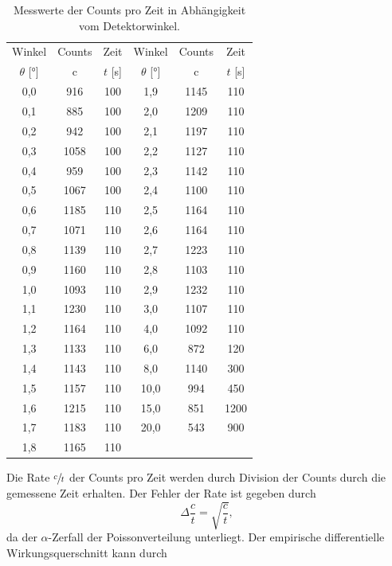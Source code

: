 \begin{table}[H]
  \centering
  \begin{tabular}{ccc|ccc}
    \toprule
    Winkel & Counts & Zeit & Winkel & Counts & Zeit \\
    $\theta$ [°] & c & $t$ [s] & $\theta$ [°] & c & $t$ [s] \\
    \midrule
    0,0 &  916 & 100 &  1,9 & 1145 & 110  \\
    0,1 &  885 & 100 &  2,0 & 1209 & 110  \\
    0,2 &  942 & 100 &  2,1 & 1197 & 110  \\
    0,3 & 1058 & 100 &  2,2 & 1127 & 110  \\
    0,4 &  959 & 100 &  2,3 & 1142 & 110  \\
    0,5 & 1067 & 100 &  2,4 & 1100 & 110  \\
    0,6 & 1185 & 110 &  2,5 & 1164 & 110  \\
    0,7 & 1071 & 110 &  2,6 & 1164 & 110  \\
    0,8 & 1139 & 110 &  2,7 & 1223 & 110  \\
    0,9 & 1160 & 110 &  2,8 & 1103 & 110  \\
    1,0 & 1093 & 110 &  2,9 & 1232 & 110  \\
    1,1 & 1230 & 110 &  3,0 & 1107 & 110  \\
    1,2 & 1164 & 110 &  4,0 & 1092 & 110  \\
    1,3 & 1133 & 110 &  6,0 &  872 & 120  \\
    1,4 & 1143 & 110 &  8,0 & 1140 & 300  \\
    1,5 & 1157 & 110 & 10,0 &  994 & 450  \\
    1,6 & 1215 & 110 & 15,0 &  851 & 1200 \\
    1,7 & 1183 & 110 & 20,0 &  543 & 900  \\
    1,8 & 1165 & 110 &                    \\
    \bottomrule
  \end{tabular}
  \caption{Messwerte der Counts pro Zeit in Abhängigkeit vom Detektorwinkel.}
  \label{tab:WQ}
\end{table}
Die Rate $\sfrac{c}{t}$ der Counts pro Zeit werden durch Division der Counts durch die gemessene Zeit erhalten.
Der Fehler der Rate ist gegeben durch
\begin{equation}
  \Delta{\frac{c}{t}} = \sqrt{\frac{c}{t}},
\end{equation}
da der $\alpha$-Zerfall der Poissonverteilung unterliegt.
Der empirische differentielle Wirkungsquerschnitt kann durch

